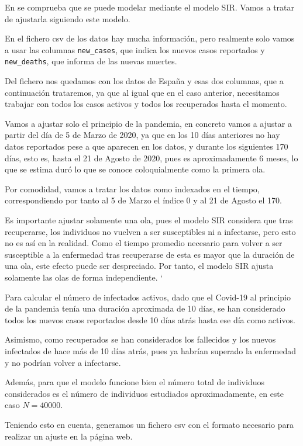 En \cite{enrique_amaro} se comprueba que se puede modelar mediante el modelo SIR. Vamos a tratar de ajustarla siguiendo este modelo.

En el fichero csv de los datos hay mucha información, pero realmente solo vamos a usar las columnas \verb|new_cases|, que indica los nuevos casos reportados y \verb|new_deaths|, que informa de las nuevas muertes.

Del fichero nos quedamos con los datos de España y esas dos columnas, que a continuación trataremos, ya que al igual que en el caso anterior, necesitamos trabajar con todos los casos activos y todos los recuperados hasta el momento.

Vamos a ajustar solo el principio de la pandemia, en concreto vamos a ajustar a partir del día de 5 de Marzo de 2020, ya que en los 10 días anteriores no hay datos reportados pese a que aparecen en los datos, y durante los siguientes 170 días, esto es, hasta el 21 de Agosto de 2020, pues es aproximadamente 6 meses, lo que se estima duró lo que se conoce coloquialmente como la primera ola.

Por comodidad, vamos a tratar los datos como indexados en el tiempo, correspondiendo por tanto al 5 de Marzo el índice 0 y al 21 de Agosto el 170.

Es importante ajustar solamente una ola, pues el modelo SIR considera que tras recuperarse, los individuos no vuelven a ser susceptibles ni a infectarse, pero esto no es así en la realidad. Como el tiempo promedio necesario para volver a ser susceptible a la enfermedad tras recuperarse de esta es mayor que la duración de una ola, este efecto puede ser despreciado. Por tanto, el modelo SIR ajusta solamente las olas de forma independiente. `

Para calcular el número de infectados activos, dado que el Covid-19 al principio de la pandemia tenía una duración aproximada de 10 días, se han considerado todos los nuevos casos reportados desde 10 días atrás hasta ese día como activos.

Asimismo, como recuperados se han considerados los fallecidos y los nuevos infectados de hace más de 10 días atrás, pues ya habrían superado la enfermedad y no podrían volver a infectarse.

Además, para que el modelo funcione bien el número total de individuos considerados es el número de individuos estudiados aproximadamente, en este caso $N=40000$.

Teniendo esto en cuenta, generamos un fichero csv con el formato necesario para realizar un ajuste en la página web.

